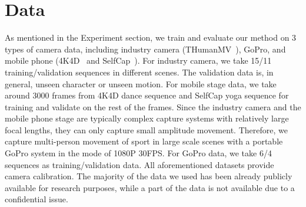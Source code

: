 \section{Data} 

As mentioned in the Experiment section, we train and evaluate our method on 3 types of camera data, including industry camera (THumanMV~\cite{zhou2024gps}), GoPro, and mobile phone (4K4D~\cite{xu20244k4d} and SelfCap~\cite{xu2024representing}). 
%
For industry camera, we take 15/11 training/validation sequences in different scenes.
The validation data is, in general, unseen character or unseen motion.
For mobile stage data, we take around 3000 frames from 4K4D dance sequence and SelfCap yoga sequence for training and validate on the rest of the frames.
Since the industry camera and the mobile phone stage are typically complex capture systems with relatively large focal lengths, they can only capture small amplitude movement.
%
Therefore, we capture multi-person movement of sport in large scale scenes with a portable GoPro system in the mode of 1080P 30FPS.
%
For GoPro data, we take 6/4 sequences as training/validation data.
%
All aforementioned datasets provide camera calibration.
%
The majority of the data we used has been already publicly available for research purposes, while a part of the data is not available due to a confidential issue.


